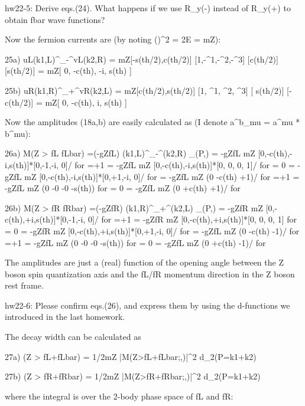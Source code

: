 \documentclass[12pt]{article}
\def\eps{\epsilon}
\begin{document}
{{hw22-5:  Derive eqs.(24).  What happens if we use R_y(\theta-\pi)
instead of R_y(\theta+\pi) to obtain fbar wave functions?

Now the fermion currents are (by noting ()^2 = 2E = mZ):

25a) uL(k1,L)^\dagger \sigma_-^\mu vL(k2,R)
   = mZ[-s(th/2),c(th/2)] [1,-\sigma^1,-\sigma^2,-\sigma^3] [c(th/2)]
                                                            [s(th/2)]
   = mZ[ 0, -c(th),  -i,  s(th) ]

25b) uR(k1,R)^\dagger \sigma_+^\mu vR(k2,L)
   = mZ[c(th/2),s(th/2)] [1, \sigma^1, \sigma^2, \sigma^3] [ s(th/2)]
                                                           [-c(th/2)]
   = mZ[ 0, -c(th),  i,  s(th) ]

Now the amplitudes (18a,b) are easily calculated as
(I denote a^\mu b_mu = a^mu * b^mu):

26a) M(Z > fL fLbar)
=(-gZfL) \uL(k1,L)^\dagger \sigma_-^\mu \vL(k2,R) \eps_\mu(P,\lambda)
= -gZfL mZ [0,-c(th),-i,s(th)]*[0,-1,-i, 0]/  for \lambda=+1
= -gZfL mZ [0,-c(th),-i,s(th)]*[0, 0, 0, 1]/  for \lambda= 0
= -gZfL mZ [0,-c(th),-i,s(th)]*[0,+1,-i, 0]/  for 
= -gZfL mZ (0 -c(th) +1)/   for \lambda=+1
= -gZfL mZ (0 -0  -0 -s(th))    for \lambda= 0
= -gZfL mZ (0 +c(th) +1)/   for 

26b) M(Z > fR fRbar)
=(-gZfR) \uR(k1,R)^\dagger \sigma_+^\mu \vR(k2,L) \eps_\mu(P,\lambda)
= -gZfR mZ [0,-c(th),+i,s(th)]*[0,-1,-i, 0]/  for \lambda=+1
= -gZfR mZ [0,-c(th),+i,s(th)]*[0, 0, 0, 1]       for \lambda= 0
= -gZfR mZ [0,-c(th),+i,s(th)]*[0,+1,-i, 0]/  for 
= -gZfL mZ (0 -c(th) -1)/   for \lambda=+1
= -gZfL mZ (0 -0  -0 -s(th))    for \lambda= 0
= -gZfL mZ (0 +c(th) -1)/   for 

The amplitudes are just a (real) function of the opening angle between
the Z boson spin quantization axis and the fL/fR momentum direction in
the Z boson rest frame.

hw22-6:  Please confirm eqs.(26), and express them by using the
d-functions we introduced in the last homework.

The decay width can be calculated as

27a) \Gamma(Z > fL+fLbar)
= 1/2mZ \Int |M(Z>fL+fLbar;\lambda,\theta)|^2 d\PS_2(P=k1+k2)

27b) \Gamma(Z > fR+fRbar)
= 1/2mZ \Int |M(Z>fR+fRbar;\lambda,\theta)|^2 d\PS_2(P=k1+k2)

where the integral is over the 2-body phase space of fL and fR:

}}
\end{document}
